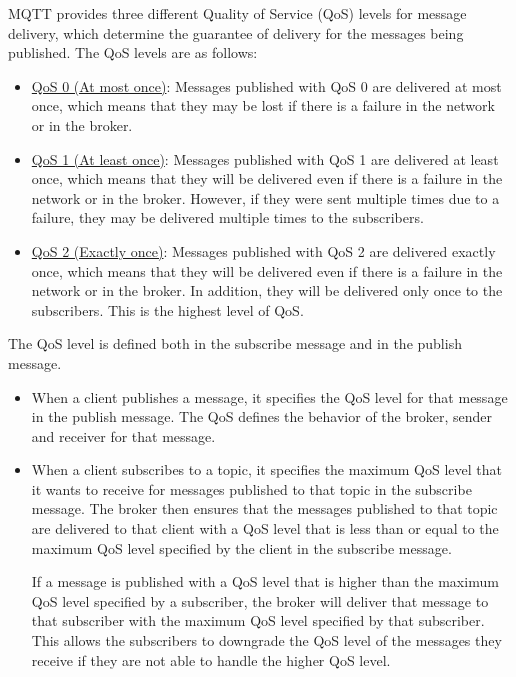 MQTT provides three different Quality of Service (QoS) levels for message delivery, which determine the guarantee of delivery for the messages being published. The QoS levels are as follows:
\begin{itemize}
    \item \ul{QoS 0 (At most once)}: Messages published with QoS 0 are delivered at most once, which means that they may be lost if there is a failure in the network or in the broker.
    \item \ul{QoS 1 (At least once)}: Messages published with QoS 1 are delivered at least once, which means that they will be delivered even if there is a failure in the network or in the broker. However, if they were sent multiple times due to a failure, they may be delivered multiple times to the subscribers.
    \item \ul{QoS 2 (Exactly once)}: Messages published with QoS 2 are delivered exactly once, which means that they will be delivered even if there is a failure in the network or in the broker. In addition, they will be delivered only once to the subscribers. This is the highest level of QoS.
\end{itemize}

The QoS level is defined both in the subscribe message and in the publish message.
\begin{itemize}
    \item When a client publishes a message, it specifies the QoS level for that message in the publish message. The QoS defines the behavior of the broker, sender and receiver for that message.
    \item When a client subscribes to a topic, it specifies the maximum QoS level that it wants to receive for messages published to that topic in the subscribe message. The broker then ensures that the messages published to that topic are delivered to that client with a QoS level that is less than or equal to the maximum QoS level specified by the client in the subscribe message.
    
    If a message is published with a QoS level that is higher than the maximum QoS level specified by a subscriber, the broker will deliver that message to that subscriber with the maximum QoS level specified by that subscriber. This allows the subscribers to downgrade the QoS level of the messages they receive if they are not able to handle the higher QoS level.
\end{itemize}